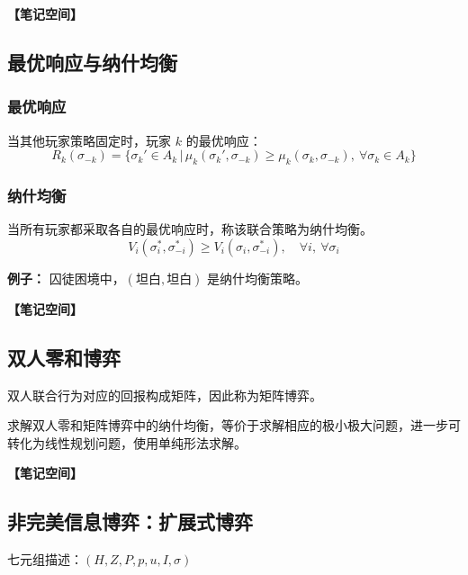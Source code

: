 \documentclass[12pt,a4paper]{article}
\newcommand{\notespace}[1][3cm]{%
  \vspace{#1}%
  \noindent\textbf{【笔记空间】}%
  \vspace{#1}%
}
\newcommand{\1}{\mathbf{1}}
\begin{document}
\notespace[2cm]

\subsection{最优响应与纳什均衡}

\subsubsection*{最优响应}

当其他玩家策略固定时，玩家 $k$ 的最优响应：
\begin{equation}
R_k(\sigma_{-k})=\bigl\{\sigma_k'\in A_k\,\big|\,\mu_k(\sigma_k',\sigma_{-k})\ge\mu_k(\sigma_k,\sigma_{-k}),\ \forall\sigma_k\in A_k\bigr\}
\end{equation}

\subsubsection*{纳什均衡}

\begin{keybox}
当所有玩家都采取各自的最优响应时，称该联合策略为纳什均衡。
\begin{equation}
V_i(\sigma_i^*,\sigma_{-i}^*)\ge V_i(\sigma_i,\sigma_{-i}^*), \quad \forall i,\ \forall\sigma_i
\end{equation}
\end{keybox}

\textbf{例子：} 囚徒困境中，$(\text{坦白},\text{坦白})$ 是纳什均衡策略。

\notespace[2cm]

\subsection{双人零和博弈}

双人联合行为对应的回报构成矩阵，因此称为矩阵博弈。

\begin{keybox}
求解双人零和矩阵博弈中的纳什均衡，等价于求解相应的极小极大问题，进一步可转化为线性规划问题，使用单纯形法求解。
\end{keybox}

\notespace[2cm]

\subsection{非完美信息博弈：扩展式博弈}

七元组描述：$(H,Z,P,p,u,I,\sigma)$
\end{document}
